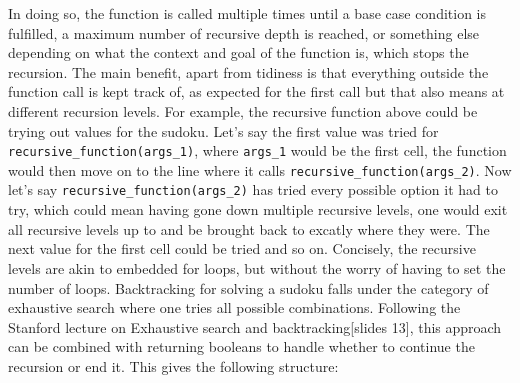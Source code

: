 \documentclass[12pt]{report} %
\begin{document}
In doing so, the function is called multiple times until a base case condition is fulfilled, a maximum number of recursive depth is reached\cite{stackoverflow_recursion_depth}, or something else depending on what the context and goal of the function is, which stops the recursion. The main benefit, apart from tidiness is that everything outside the function call is kept track of, as expected for the first call but that also means at different recursion levels. For example, the recursive function above could be trying out values for the sudoku. Let's say the first value was tried for \texttt{recursive\_function(args\_1)}, where \texttt{args\_1} would be the first cell, the function would then move on to the line where it calls \texttt{recursive\_function(args\_2)}. Now let's say \texttt{recursive\_function(args\_2)} has tried every possible option it had to try, which could mean having gone down multiple recursive levels, one would exit all recursive levels up to  and be brought back to excatly where they were. The next value for the first cell could be tried and so on. Concisely, the recursive levels are akin to embedded for loops, but without the worry of having to set the number of loops.
Backtracking for solving a sudoku falls under the category of exhaustive search where one tries all possible combinations. Following the Stanford lecture on Exhaustive search and backtracking[slides 13]\cite{stanford_lecture}, this approach can be combined with returning booleans to handle whether to continue the recursion or end it. This gives the following structure:
\end{document}
